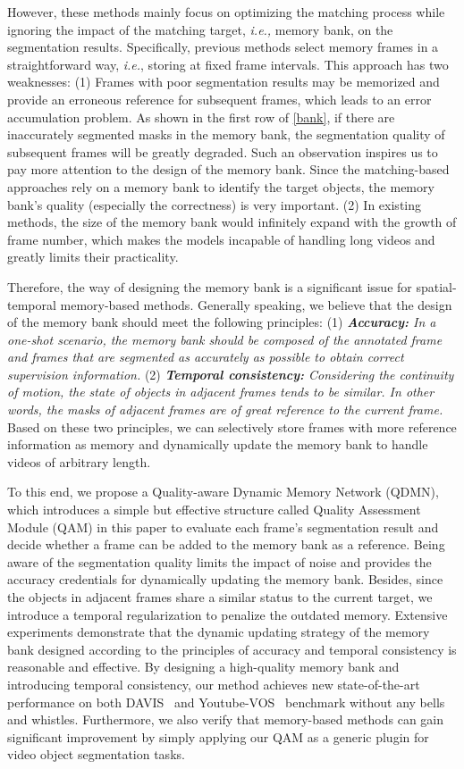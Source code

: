 \documentclass[runningheads]{llncs}
\begin{document}
However, these methods mainly focus on optimizing the matching process while ignoring the impact of the matching target, \textit{i.e.,} memory bank, on the segmentation results.
Specifically, previous methods select memory frames in a straightforward way, \textit{i.e.}, storing at fixed frame intervals. 
This approach has two weaknesses: 
(1) Frames with poor segmentation results may be memorized and provide an erroneous reference for subsequent frames, which leads to an error accumulation problem.
As shown in the first row of \cref{bank}, if there are inaccurately segmented masks in the memory bank, the segmentation quality of subsequent frames will be greatly degraded. 
Such an observation inspires us to pay more attention to the design of the memory bank.
Since the matching-based approaches rely on a memory bank to identify the target objects, the memory bank's quality (especially the correctness) is very important.
(2) In existing methods, the size of the memory bank would infinitely expand with the growth of frame number, which makes the models incapable of handling long videos and greatly limits their practicality.

Therefore, the way of designing the memory bank is a significant issue for spatial-temporal memory-based methods.
Generally speaking, we believe that the design of the memory bank should meet the following principles: (1) \textit{\textbf{Accuracy:} In a one-shot scenario, the memory bank should be composed of the annotated frame and frames that are segmented as accurately as possible to obtain correct supervision information.} 
(2) \textit{\textbf{Temporal consistency:} Considering the continuity of motion, the state of objects in adjacent frames tends to be similar. In other words, the masks of adjacent frames are of great reference to the current frame.} Based on these two principles, we can selectively store frames with more reference information as memory and dynamically update the memory bank to handle videos of arbitrary length. 

To this end, we propose a Quality-aware Dynamic Memory Network (QDMN), which
introduces a simple but effective structure called Quality Assessment Module (QAM) in this paper to evaluate each frame's segmentation result and decide whether a frame can be added to the memory bank as a reference.
Being aware of the segmentation quality limits the impact of noise and provides the accuracy credentials for dynamically updating the memory bank.
Besides, since the objects in adjacent frames share a similar status to the current target, we introduce a temporal regularization to penalize the outdated memory.
Extensive experiments demonstrate that the dynamic updating strategy of the memory bank designed according to the principles of accuracy and temporal consistency is reasonable and effective.
By designing a high-quality memory bank and introducing temporal consistency, our method achieves new state-of-the-art performance on both DAVIS~\cite{davis17} and Youtube-VOS~\cite{youtube} benchmark without any bells and whistles. 
Furthermore, we also verify that memory-based methods can gain significant improvement by simply applying our QAM as a generic plugin for video object segmentation tasks.
\end{document}
